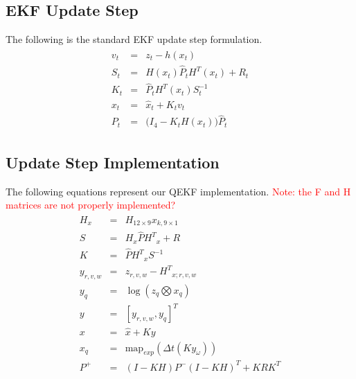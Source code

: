 \documentclass[letterpaper, 10 pt, conference]{ieeeconf}  %
\newcommand{\transpose}[1]{\ensuremath{#1^{\scriptscriptstyle T}}}
\begin{document}
\subsection{EKF Update Step}
The following is the standard EKF update step formulation.
\begin{equation}
\begin{split}\begin{array}{rcl}
        {v}_t &=& {z}_t - {h}({x}_t) \\
        {S}_t &=& {H}({x}_t) \hat{{P}}_t {H}^T({x}_t) + {R}_t \\
        {K}_t &=& \hat{{P}}_t {H}^T({x}_t) {S}_t^{-1} \\
        {x}_t &=& \hat{{x}}_t + {K}_t {v}_t \\
        {P}_t &=& \big({I}_4 - {K}_t{H}(x_t)\big)\hat{{P}}_t
\end{array}\end{split}
\end{equation}



\subsection{Update Step Implementation}
The following equations represent our QEKF implementation.
\textcolor{red}{Note: the F and H matrices are not properly implemented?}
\begin{equation}
\begin{split}\begin{array}{lll}
  {H}_{x}  & = & {H}_{12 \times 9} {x}_{k, 9 \times 1}\\
  {S} & = & {H}_{x}\hat{{P}}\transpose{{H}}_{x}+ {R}\\
  {K} & = & \hat{{P}} \transpose{{H}}_{x} {S}^{-1}\\
  {y}_{r,v,w} & = & {z}_{r,v,w} - \transpose{{H}}_{x;r,v,w} \\
  {y}_{q} & = &  \log({z}_{q} \bigotimes   {x}_{q})\\
  {y} & = & \transpose{\left[{y}_{r,v,w}, {y}_{q} \right]}\\
  {x} & = & \hat{{x}} + {K} {y} \\
  {x}_{q} & = & \text{map}_{exp}(\Delta t (Ky_{\omega} )) \\
  P^{+} & = & (I - KH) P^{-} \transpose{(I -KH)} + KR \transpose{K}\\
\end{array}\end{split}
\end{equation}
\end{document}
